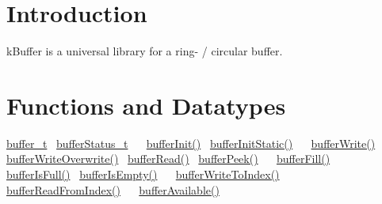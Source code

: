 \hypertarget{index_intro}{}\section{Introduction}\label{index_intro}
k\+Buffer is a universal library for a ring-\/ / circular buffer. \hypertarget{index_function}{}\section{Functions and Datatypes}\label{index_function}
\hyperlink{structbuffer__t}{buffer\+\_\+t}~\newline
 \hyperlink{k_buffer_8h_a7a0bf550b7bd49d85172e409c0034fe6}{buffer\+Status\+\_\+t}~\newline
 ~\newline
 \hyperlink{k_buffer_8c_aec18d6ea571b1326dbeb7ca15f4969c0}{buffer\+Init()}~\newline
 \hyperlink{k_buffer_8c_a8da8904eb3cb9b87699cf0f45ce5bf51}{buffer\+Init\+Static()}~\newline
 ~\newline
 \hyperlink{k_buffer_8c_a9d6410a89adf65a3ef12340ecb9bbd55}{buffer\+Write()}~\newline
 \hyperlink{k_buffer_8c_af040a9062bc907adde9517c27c870be5}{buffer\+Write\+Overwrite()}~\newline
 \hyperlink{k_buffer_8c_a9b80be9033ccd6b5a101f811520ab4cc}{buffer\+Read()}~\newline
 \hyperlink{k_buffer_8c_a5ecef1fd460ed9635269abce02be866f}{buffer\+Peek()}~\newline
 ~\newline
 \hyperlink{k_buffer_8c_ac806d926fd21729feb18f8e7738e76b4}{buffer\+Fill()} ~\newline
 \hyperlink{k_buffer_8c_ac69b8a12a33d0cf0a5dab8feb4f7b020}{buffer\+Is\+Full()}~\newline
 \hyperlink{k_buffer_8c_a5c599b9386c73ccd7b5eeb25f6cca38e}{buffer\+Is\+Empty()}~\newline
 ~\newline
 \hyperlink{k_buffer_8c_a8508583be1e356a243b0ce67254c516e}{buffer\+Write\+To\+Index()}~\newline
 \hyperlink{k_buffer_8c_aa0d7e2a4b6fd3da2822d7f968be74e5c}{buffer\+Read\+From\+Index()}~\newline
 ~\newline
 \hyperlink{k_buffer_8c_afa8bb2b701cd9b7f871c12e0fabd66e1}{buffer\+Available()}~\newline
 ~\newline
